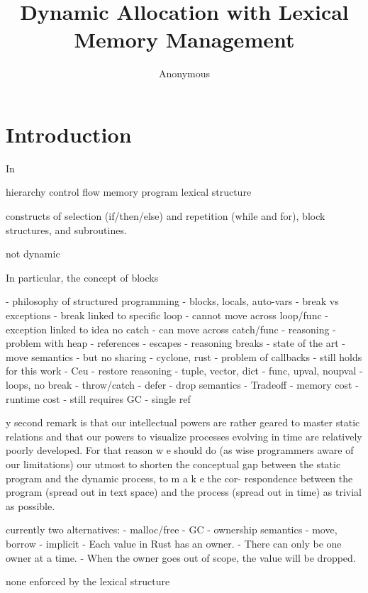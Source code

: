 \documentclass[12pt]{article}
\title {
    Dynamic Allocation with Lexical Memory Management
}
\author{Anonymous}
\begin{document}
\maketitle

\begin{abstract}
\end{abstract}


\section{Introduction}

In

hierarchy
control flow
memory
program lexical structure

constructs of selection (if/then/else) and repetition (while and for), block structures, and subroutines.

not dynamic



In particular, the concept of blocks


- philosophy of structured programming
    - blocks, locals, auto-vars
    - break vs exceptions
        - break linked to specific loop
            - cannot move across loop/func
        - exception linked to idea no catch
            - can move across catch/func
    - reasoning
- problem with heap
    - references
    - escapes
    - reasoning breaks
- state of the art
    - move semantics
    - but no sharing
    - cyclone, rust
        - problem of callbacks
            - still holds for this work
- Ceu
    - restore reasoning
    - tuple, vector, dict
    - func, upval, noupval
    - loops, no break
    - throw/catch
    - defer
    - drop semantics
- Tradeoff
    - memory cost
    - runtime cost
    - still requires GC
    - single ref

 y second remark is that our intellectual powers are rather
geared to master static relations and that our powers to visualize
processes evolving in time are relatively poorly developed. For
that reason w e should do (as wise programmers aware of our
limitations) our utmost to shorten the conceptual gap between
the static program and the dynamic process, to m a k e the cor-
respondence between the program (spread out in text space) and
the process (spread out in time) as trivial as possible.

currently two alternatives:
    - malloc/free
    - GC
    - ownership semantics
        - move, borrow
            - implicit
        - Each value in Rust has an owner.
        - There can only be one owner at a time.
        - When the owner goes out of scope, the value will be dropped.

none enforced by the lexical structure



\label{sec.introduction}



\end{document}
